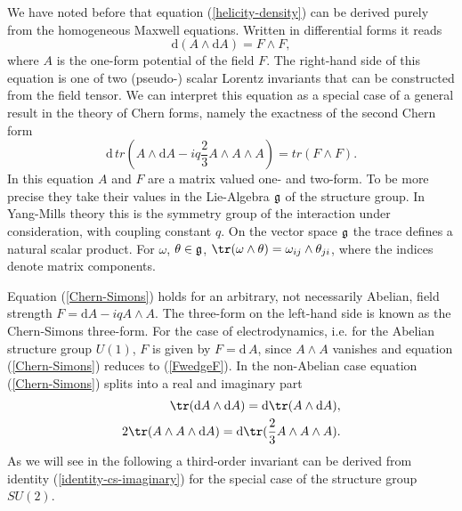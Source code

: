 \documentclass[10pt]{iopart}
\def \d{\mbox{d}}
\def \Eq{equation }
\begin{document}
We have noted before that \Eq (\ref{helicity-density}) can be derived
purely from the homogeneous Maxwell equations.
Written in differential forms it reads   
\begin{equation}
 \d(A \wedge \d A)=  F\wedge F  \label{FwedgeF},
\end{equation}
where $A$ is the one-form potential of the field $F$.
The right-hand side of this equation is one of two 
(pseudo-) scalar Lorentz
invariants that can be constructed from the field tensor. We can
interpret this equation as a special case of a general result in the
theory of Chern forms, namely the exactness of the second Chern form
\begin{equation}
   \d\,tr(A\wedge \d A - i q \frac{2}{3}A \wedge A \wedge A) = tr(F\wedge F).
\label{Chern-Simons} 
\end{equation}
In this equation $A$ and $F$ are a matrix 
valued one- and two-form.
To be more precise they take their values
in the Lie-Algebra ${\frak g}$ of the structure group.
In Yang-Mills theory this is the symmetry group of the 
interaction under consideration, with coupling constant $q$.
On the vector space ${\frak g}$ the trace defines a
natural scalar product.
For $\omega$, $\theta \in {\frak g}$,
$\tr(\omega\wedge\theta)= \omega_{ij}\wedge \theta_{ji}$, where the
indices denote matrix components.

Equation (\ref{Chern-Simons})
holds for an arbitrary, not necessarily Abelian, field
strength $F = \d A - i q A \wedge A$. The three-form on the left-hand side
is known as the Chern-Simons three-form. For the case of electrodynamics,
i.e. for the Abelian structure group $U(1)$, $F$ is given by
$F=\d\, A$, since $A \wedge A $ vanishes and \Eq (\ref{Chern-Simons})
reduces to  (\ref{FwedgeF}).  In the non-Abelian case
\Eq (\ref{Chern-Simons})
splits into a real and imaginary part
\begin{eqnarray}
   \tr(\d A \wedge \d A) = \d\tr(A\wedge \d A), \label{identity-cs-real}\\
   2\tr(A \wedge A \wedge \d A ) 
   = \d\tr(\frac{2}{3}A \wedge A \wedge A) .\label{identity-cs-imaginary}
\end{eqnarray}
As we will see in the following  a third-order invariant can be
derived from identity (\ref{identity-cs-imaginary}) for the special case
of the structure group $SU(2)$.
\end{document}
